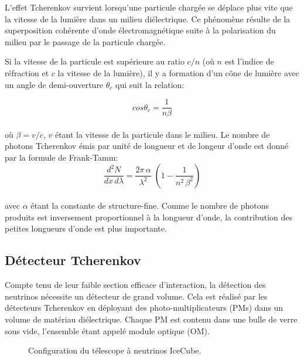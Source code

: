 L'effet Tcherenkov survient lorsqu'une particule chargée se déplace plus vite que la vitesse de la lumière dans un milieu diélectrique. Ce phénomène résulte de la superposition cohérente d'onde électromagnétique suite à la polarisation du milieu par le passage de la particule chargée.

Si la vitesse de la particule est supérieure au ratio $c/n$ (où $n$ est l'indice de réfraction et $c$ la vitesse de la lumière), il y a formation d'un cône de lumière avec un angle de demi-ouverture $\theta_c$ qui suit la relation:

\begin{equation}
    cos\theta_c = \frac{1}{n\beta}
\end{equation}\\

où $\beta = v/c$, $v$ étant la vitesse de la particule dans le milieu. Le nombre de photons Tcherenkov émis par unité de longueur et de longeur d'onde est donné par la formule de Frank-Tamm: \\

\begin{equation}
     \frac{d^2N}{dx \, d\lambda} = \frac{2\pi \, \alpha}{\lambda^2} \; (1- \frac{1}{n^2 \, \beta^2} )
\end{equation}\\

avec $\alpha$ étant la constante de structure-fine. Comme le nombre de photons produits est inversement proportionnel à la longueur d'onde, la contribution des petites longueurs d'onde est plus importante.

\subsection{Détecteur Tcherenkov}

Compte tenu de leur faible section efficace d'interaction, la détection des neutrinos nécessite un détecteur de grand volume. Cela est réalisé par les détecteurs Tcherenkov en déployant des photo-multiplicateurs (PMs) dans un volume de matériau diélectrique. Chaque PM est contenu dans une bulle de verre sous vide, l'ensemble étant appelé module optique (OM).\\

\begin{figure}[h!]
    \caption{\label{fig:IceCube} Configuration du télescope à neutrinos IceCube.}
\end{figure}

